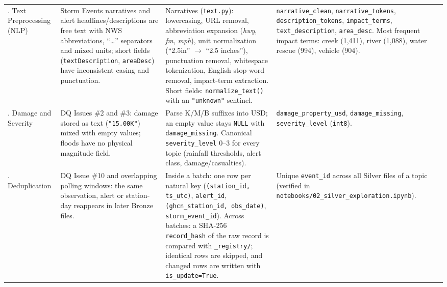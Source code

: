 \documentclass[stu, 12pt, letterpaper, donotrepeattitle, floatsintext, natbib]{apa7}
\begin{document}
\begin{table}[H]
\begin{tabularx}{\textwidth}{>{\raggedright\arraybackslash}p{2.2cm} >{\raggedright\arraybackslash}p{3.6cm} >{\raggedright\arraybackslash}p{4.6cm} >{\raggedright\arraybackslash}X}
6. Text Preprocessing (NLP) & Storm Events narratives and alert headlines/descriptions are free text with NWS abbreviations, ``\ldots'' separators and mixed units; short fields (\texttt{textDescription}, \texttt{areaDesc}) have inconsistent casing and punctuation. & Narratives (\texttt{text.py}): lowercasing, URL removal, abbreviation expansion (\emph{hwy}, \emph{fm}, \emph{mph}), unit normalization (``2.5in'' $\rightarrow$ ``2.5 inches''), punctuation removal, whitespace tokenization, English stop-word removal, impact-term extraction. Short fields: \texttt{normalize\_text()} with an \texttt{"unknown"} sentinel. & \texttt{narrative\_clean}, \texttt{narrative\_tokens}, \texttt{description\_tokens}, \texttt{impact\_terms}, \texttt{text\_description}, \texttt{area\_desc}. Most frequent impact terms: creek (1,411), river (1,088), water rescue (994), vehicle (904). \\
\addlinespace
7. Damage and Severity & DQ Issues \#2 and \#3: damage stored as text (\texttt{"15.00K"}) mixed with empty values; floods have no physical magnitude field. & Parse K/M/B suffixes into USD; an empty value stays \texttt{NULL} with \texttt{damage\_missing}. Canonical \texttt{severity\_level} 0--3 for every topic (rainfall thresholds, alert class, damage/casualties). & \texttt{damage\_property\_usd}, \texttt{damage\_missing}, \texttt{severity\_level} (\texttt{int8}). \\
\addlinespace
8. Deduplication & DQ Issue \#10 and overlapping polling windows: the same observation, alert or station-day reappears in later Bronze files. & Inside a batch: one row per natural key (\texttt{(station\_id, ts\_utc)}, \texttt{alert\_id}, \texttt{(ghcn\_station\_id, obs\_date)}, \texttt{storm\_event\_id}). Across batches: a SHA-256 \texttt{record\_hash} of the raw record is compared with \texttt{\_registry/}; identical rows are skipped, and changed rows are written with \texttt{is\_update=True}. & Unique \texttt{event\_id} across all Silver files of a topic (verified in \texttt{notebooks/02\_silver\_exploration.ipynb}). \\
\bottomrule
\end{tabularx}
\end{table}
\end{document}
